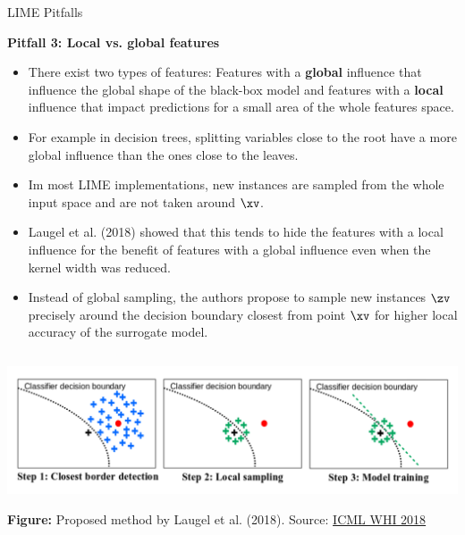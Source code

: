 \documentclass[11pt,compress,t,notes=noshow, xcolor=table]{beamer}
\begin{document}
\begin{vbframe}{LIME Pitfalls}

\textbf{Pitfall 3: Local vs. global features}
\begin{itemize}
	\item There exist two types of features: Features with a \textbf{global} influence that influence the global shape of the black-box model and features with a \textbf{local} influence that impact predictions for a small area of the whole features space. 
	\item For example in decision trees, splitting variables close to the root have a more global influence than the ones close to the leaves. 
	\item Im most LIME implementations, new instances are sampled from the whole input space and are not taken around $\xv$.
	\item Laugel et al. (2018) showed that this tends to hide the features with a local influence for the benefit of features with a global influence even when the kernel width was reduced. 
	\item Instead of global sampling, the authors propose to sample new instances $\zv$ precisely around the decision boundary closest from point $\xv$ for higher local accuracy of the surrogate model. 
\end{itemize}

\framebreak


\begin{columns}
	
	\begin{column}{0.68\textwidth}
			\vspace{-0.7cm}
		 \begin{center}
		\includegraphics[width=1\textwidth]{figure/lime_bordersample}
		
		\vspace{-0.3cm}
		{\tiny \textbf{Figure:} Proposed method by Laugel et al. (2018). Source: \href{http://webia.lip6.fr/~laugel/files/WHI_ICML_slides.pdf}{ICML WHI 2018}}
		

\end{center}
\end{column}
\end{columns}
\end{vbframe}
\end{document}
